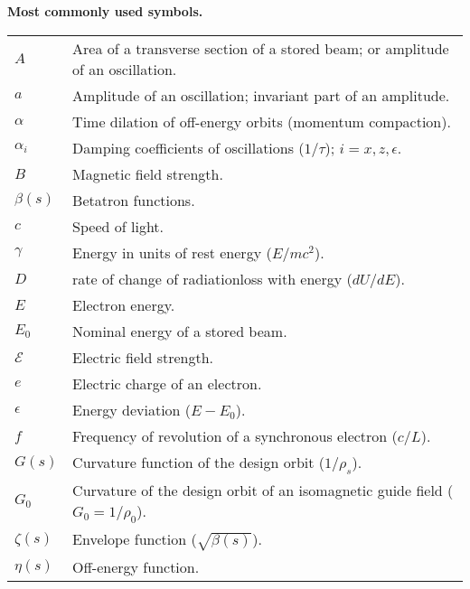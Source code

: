 \begin{center}
	\textbf{\large Most commonly used symbols.}
\end{center}

\begin{tabularx}{\linewidth}{@{}lX@{}}
	$A$			& Area of a transverse section of a stored beam; or amplitude of an oscillation.\\
	$a$			& Amplitude of an oscillation; invariant part of an amplitude.\\
    $\alpha$	& Time dilation of off-energy orbits (momentum compaction).\\
	$\alpha_i$	& Damping coefficients of oscillations ($1/\tau$); $i = x, z, \epsilon$.\\
    $B$			& Magnetic field strength.\\
	$\beta(s)$	& Betatron functions.\\
	$c$			& Speed of light.\\
	$\gamma$	& Energy in units of rest energy ($E/mc^2$).\\
	$D$			& %
    				rate of change of radiationloss with energy ($dU/dE$).\\
	$E$			& Electron energy.\\
    $E_0$		& Nominal energy of a stored beam.\\
    $\mathscr{E}$ & Electric field strength.\\
    $e$			& Electric charge of an electron.\\
	$\epsilon$	& Energy deviation ($E - E_0$).\\
    $f$			& Frequency of revolution of a synchronous electron ($c/L$).\\
    $G(s)$		& Curvature function of the design orbit ($1/\rho_s$).\\
    $G_0$		& Curvature of the design orbit of an isomagnetic guide field ($G_0 = 1/\rho_0$).\\
	$\zeta(s)$	& Envelope function ($\sqrt{\beta(s)}$).\\
    $\eta(s)$	& Off-energy function.\\

\end{tabularx}
